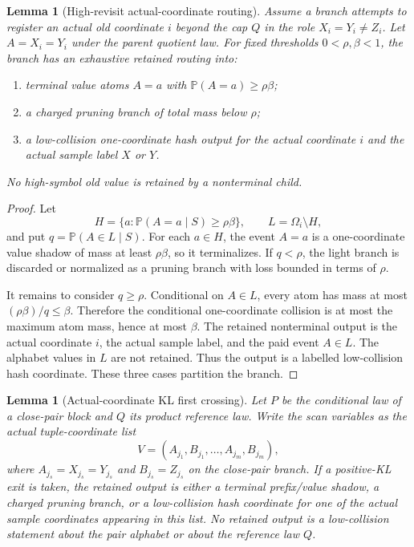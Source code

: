 \documentclass[11pt]{article}
\newtheorem{lemma}[theorem]{Lemma}
\theoremstyle{remark}
\newcommand{\Prob}{\mathbb P}
\begin{document}
\begin{lemma}[High-revisit actual-coordinate routing]\label{lem:crit-high-revisit}
Assume a branch attempts to register an actual old coordinate $i$ beyond the cap $Q$ in the role $X_i=Y_i\ne Z_i$.  Let $A=X_i=Y_i$ under the parent quotient law.  For fixed thresholds $0<\rho,\beta<1$, the branch has an exhaustive retained routing into:
\begin{enumerate}[label=\textup{(\roman*)}]
\item terminal value atoms $A=a$ with $\Prob(A=a)\ge \rho\beta$;
\item a charged pruning branch of total mass below $\rho$;
\item a low-collision one-coordinate hash output for the actual coordinate $i$ and the actual sample label $X$ or $Y$.
\end{enumerate}
No high-symbol old value is retained by a nonterminal child.
\end{lemma}

\begin{proof}
Let
\[
        H=\{a:\Prob(A=a\mid S)\ge \rho\beta\},
        \qquad L=\Omega_i\setminus H,
\]
and put $q=\Prob(A\in L\mid S)$.  For each $a\in H$, the event $A=a$ is a one-coordinate value shadow of mass at least $\rho\beta$, so it terminalizes.  If $q<\rho$, the light branch is discarded or normalized as a pruning branch with loss bounded in terms of $\rho$.

It remains to consider $q\ge\rho$.  Conditional on $A\in L$, every atom has mass at most $(\rho\beta)/q\le \beta$.  Therefore the conditional one-coordinate collision is at most the maximum atom mass, hence at most $\beta$.  The retained nonterminal output is the actual coordinate $i$, the actual sample label, and the paid event $A\in L$.  The alphabet values in $L$ are not retained.  Thus the output is a labelled low-collision hash coordinate.  These three cases partition the branch.
\end{proof}

\begin{lemma}[Actual-coordinate KL first crossing]\label{lem:crit-kl-actual}
Let $P$ be the conditional law of a close-pair block and $Q$ its product reference law.  Write the scan variables as the actual tuple-coordinate list
\[
        V=(A_{j_1},B_{j_1},\ldots,A_{j_m},B_{j_m}),
\]
where $A_{j_s}=X_{j_s}=Y_{j_s}$ and $B_{j_s}=Z_{j_s}$ on the close-pair branch.  If a positive-KL exit is taken, the retained output is either a terminal prefix/value shadow, a charged pruning branch, or a low-collision hash coordinate for one of the actual sample coordinates appearing in this list.  No retained output is a low-collision statement about the pair alphabet or about the reference law $Q$.
\end{lemma}
\end{document}
